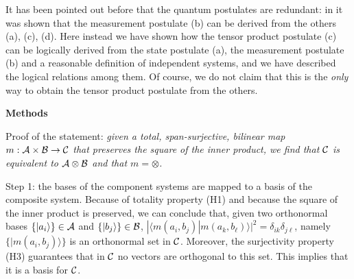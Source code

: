 \documentclass[aps,prl,amsmath,amssymb,twocolumn,nofootinbib]{revtex4}
\theoremstyle{plain}
\theoremstyle{definition}
\theoremstyle{remark}
\def\>{\rangle}
\def\<{\langle}
\begin{document}
It has been pointed out before that the quantum postulates are
redundant: in \cite{masanes} it was shown that the measurement
postulate (b) can be derived from the others (a), (c), (d). Here
instead we have shown how the tensor product postulate (c) can be
logically derived from the state postulate (a), the measurement
postulate (b) and a reasonable definition of independent systems, and
we have described the logical relations among them.  Of course, we do
not claim that this is the {\em only} way to obtain the tensor product
postulate from the others.

\baselineskip
{\par\noindent\bf Methods}

Proof of the statement: {\em given a total, span-surjective, bilinear
  map $m:{\cal A}\times{\cal B}\to{\cal C}$ that preserves the square
  of the inner product, we find that $\cal C $ is equivalent to $\cal
  A \otimes \cal B $ and that $m=\otimes$.}

Step 1: the bases of the component systems are mapped to a basis of
the composite system. Because of totality property (H1) and because
the square of the inner product is preserved, we can conclude that,
given two orthonormal bases $\{|a_i\>\}\in{\cal A}$ and
$\{|b_j\>\}\in{\cal B}$,
$|\<m(a_i,b_j)|m(a_k,b_\ell)\>|^2=\delta_{ik}\delta_{j\ell}$, namely
$\{|m(a_i,b_j)\>\}$ is an orthonormal set in $\cal C$.  Moreover, the
surjectivity property (H3) guarantees that in $\cal C$ no vectors are
orthogonal to this set. This implies that it is a basis for $\cal C$.
\end{document}
